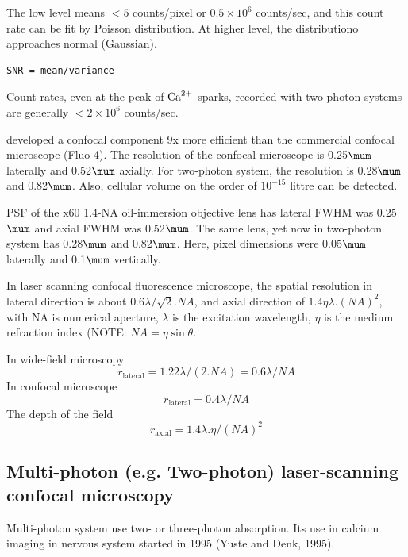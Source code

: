 The low level means $< 5$ counts/pixel or $0.5\times 10^6$ counts/sec, and this
count rate can be fit by Poisson distribution. At higher level, the
distributiono approaches normal (Gaussian).
\begin{verbatim}
SNR = mean/variance
\end{verbatim}
Count rates, even at the peak of ${\text{Ca}^{2+}}$ sparks, recorded with two-photon systems
are generally $< 2\times 10^6$ counts/sec. 


\citep{wier2000} developed a confocal component 9x more efficient than the
commercial confocal microscope (Fluo-4). The resolution of the confocal
microscope is 0.25$\mum$ laterally and 0.52$\mum$ axially. For two-photon
system, the resolution is 0.28$\mum$ and 0.82$\mum$. Also, cellular volume on
the order of $10^{-15}$ littre can be detected.

PSF of the x60 1.4-NA oil-immersion objective lens has lateral FWHM was
0.25$\mum$ and axial FWHM was 0.52$\mum$. The same lens, yet now in two-photon
system has 0.28$\mum$ and 0.82$\mum$. Here, pixel dimensions were 0.05$\mum$
laterally and 0.1$\mum$ vertically. 


In laser scanning confocal fluorescence microscope, the spatial resolution in
lateral direction is about $0.6\lambda/\sqrt{2}. NA$, and axial direction of
$1.4\eta\lambda. (NA)^2$, with NA is numerical aperture, $\lambda$ is the
excitation wavelength, $\eta$ is the medium refraction index (NOTE:
$NA=\eta\sin\theta$.

In wide-field microscopy
\begin{equation}
r_\text{lateral} = 1.22\lambda / (2. NA)= 0.6\lambda/NA   
\end{equation}
In confocal microscope
\begin{equation}
r_\text{lateral} = 0.4\lambda/NA
\end{equation}
The depth of the field
\begin{equation}
r_\text{axial} = 1.4\lambda .\eta/(NA)^2
\end{equation}

\subsection{Multi-photon (e.g. Two-photon) laser-scanning confocal microscopy}
\label{sec:multi-photon_micro}

Multi-photon system use two- or three-photon absorption. Its use in calcium
imaging in nervous system started in 1995 (Yuste and Denk, 1995).

